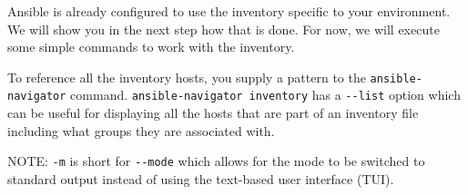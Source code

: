 Ansible is already configured to use the inventory specific to your
environment. We will show you in the next step how that is done. For
now, we will execute some simple commands to work with the inventory.

To reference all the inventory hosts, you supply a pattern to the
\texttt{ansible-navigator} command.
\texttt{ansible-navigator\ inventory} has a \texttt{-\/-list} option
which can be useful for displaying all the hosts that are part of an
inventory file including what groups they are associated with.

\begin{Shaded}
\begin{Highlighting}[]
\ExtensionTok{[student@controller}\NormalTok{ rhel\_workshop]$ cd /home/student}
\ExtensionTok{[student@controller}\NormalTok{ \textasciitilde{}]$ ansible{-}navigator inventory } 
\ExtensionTok{\{}
    \ExtensionTok{:}\NormalTok{ \{}
        \ExtensionTok{:}\NormalTok{ \{}
            \ExtensionTok{:}\NormalTok{ \{}
                \ExtensionTok{:} 
            \ExtensionTok{\},}
            \ExtensionTok{:}\NormalTok{ \{}
                \ExtensionTok{:} 
            \ExtensionTok{\}}
        \ExtensionTok{\}}
    \ExtensionTok{\}}\ExtensionTok{,}
    \ExtensionTok{:}\NormalTok{ \{}
        \ExtensionTok{:}\NormalTok{ [}
            \ExtensionTok{,}
            \ExtensionTok{,}
        \ExtensionTok{]}
    \ExtensionTok{\}}\ExtensionTok{,}
    \ExtensionTok{:}\NormalTok{ \{}
        \ExtensionTok{:}\NormalTok{ [}
        \ExtensionTok{]}
    \ExtensionTok{\}}\ExtensionTok{,}
    \ExtensionTok{:}\NormalTok{ \{}
        \ExtensionTok{:}\NormalTok{ [}
        \ExtensionTok{]}
    \ExtensionTok{\}}
\ExtensionTok{\}}
\end{Highlighting}
\end{Shaded}

NOTE: \texttt{-m} is short for \texttt{-\/-mode} which allows for the
mode to be switched to standard output instead of using the text-based
user interface (TUI).

